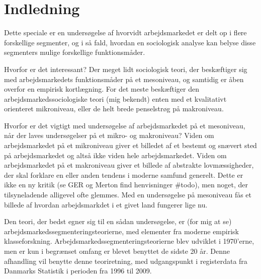 
\chapter{Indledning \label{indledning}}

Dette speciale er en undersøgelse af hvorvidt arbejdsmarkedet er delt op i flere forskellige segmenter, og i så fald, hvordan en sociologisk analyse kan belyse disse segmenters mulige forskellige funktionsmåder.

Hvorfor er det interessant? Der meget lidt sociologisk teori, der beskæftiger sig med arbejdsmarkedets funktionsmåder på et mesoniveau, og samtidig er åben overfor en empirisk kortlægning. For det meste beskæftiger den arbejdsmarkedssociologiske teori (mig bekendt) enten med et kvalitativt orienteret mikroniveau, eller de helt brede penselstrøg på makroniveau.

Hvorfor er det vigtigt med undersøgelse af arbejdsmarkedet på et mesoniveau, når der laves undersøgelser på et mikro- og makroniveau? Viden om arbejdsmarkedet på et mikroniveau giver et billedet af et bestemt og snævert sted på arbejdsmarkedet og altså ikke viden hele arbejdsmarkedet. Viden om arbejdsmarkedet på et makroniveau giver et billede af abstrakte lovmæssigheder, der skal forklare en eller anden tendens i moderne samfund generelt. Dette er ikke en ny kritik (se GER og Merton find henvisninger \#todo), men noget, der tilsyneladende alligevel ofte glemmes. Med en undersøgelse på mesoniveau fås et billede af hvordan arbejdsmarkdet i et givet land fungerer lige nu.

Den teori, der bedst egner sig til en sådan undersøgelse, er (for mig at se) arbejdsmarkedssegmenteringsteorierne, med elementer fra moderne empirisk klasseforskning. Arbejdsmarkedssegmenteringsteorierne blev udviklet i 1970'erne, men er kun i begrænset omfang er blevet benyttet de sidste 20 år. Denne afhandling vil benytte denne teoriretning, med udgangspunkt i registerdata fra Danmarks Statistik i perioden fra 1996 til 2009.



